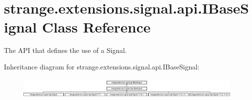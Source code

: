 \hypertarget{interfacestrange_1_1extensions_1_1signal_1_1api_1_1_i_base_signal}{\section{strange.\-extensions.\-signal.\-api.\-I\-Base\-Signal Class Reference}
\label{interfacestrange_1_1extensions_1_1signal_1_1api_1_1_i_base_signal}
}


The A\-P\-I that defines the use of a Signal.  


Inheritance diagram for strange.\-extensions.\-signal.\-api.\-I\-Base\-Signal\-:\begin{figure}[H]
\begin{center}
\leavevmode
\includegraphics[height=1.073483cm]{interfacestrange_1_1extensions_1_1signal_1_1api_1_1_i_base_signal}
\end{center}
\end{figure}
